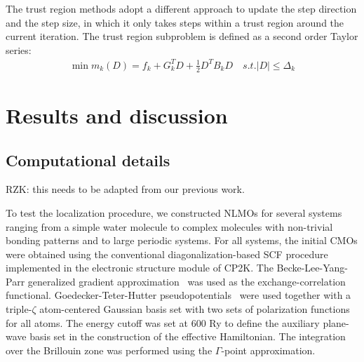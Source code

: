 \documentclass[aps,prl,reprint,amsmath,amssymb]{revtex4-1}
\begin{document}
The trust region methods adopt a different approach to update the step direction and the step size, in which it only takes steps within a trust region around the current iteration. The trust region subproblem  is defined as a second order Taylor series:
%
\begin{equation} \label{eq:tr_subproblem}
\begin{split}
\min m_{k}(D) = f_{k} + G_{k}^T D + \frac{1}{2}D^T B_{k}D    \quad s.t. \lvert D \rvert \leq \Delta_{k}
\end{split}
\end{equation}
%





\section{Results and discussion}
\subsection{Computational details}

RZK: this needs to be adapted from our previous work. 

To test the localization procedure, we constructed NLMOs for several systems ranging from a simple water molecule to complex molecules with non-trivial bonding patterns and to large periodic systems. 
For all systems, the initial CMOs were obtained using the conventional diagonalization-based SCF procedure implemented in the electronic structure module of CP2K. 
The Becke-Lee-Yang-Parr generalized gradient approximation~\cite{becke1988density, lee1988development} was used as the exchange-correlation functional.
Goedecker-Teter-Hutter pseudopotentials~\cite{goedecker1996separable} were used together with a triple-$\zeta$ atom-centered Gaussian basis set with two sets of polarization functions for all atoms. 
The energy cutoff was set at 600 Ry to define the auxiliary plane-wave basis set in the construction of the effective Hamiltonian. 
The integration over the Brillouin zone was performed using the $\Gamma$-point approximation.
\end{document}
